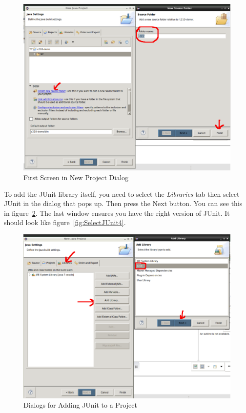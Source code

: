 \documentclass[nobib]{tufte-handout}
\begin{document}
\vspace{.1in}
\begin{center}
\begin{figure}[!htb]
\includegraphics[scale=.3]{Eclipse-AddTestFolder.png}
\caption{First Screen in New Project Dialog}
\label{fig:newsrcfold}
\end{figure}
\end{center}
\vspace{.1in}

To add the JUnit library itself, you need to select the \textit{Libraries} tab then select JUnit in the dialog that pops up. Then press the Next button. You can see this in figure~\ref{fig:AddJUnitLib}. The last window ensures you have the right version of JUnit. It should look like figure~\ref{fig:SelectJUnit4}.

\vspace{.1in}
\begin{center}
\begin{figure}[!htb]
\includegraphics[scale=.3]{Eclipse-AddJUnitLib.png}
\caption{Dialogs for Adding JUnit to a Project}
\label{fig:AddJUnitLib}
\end{figure}
\end{center}
\vspace{.1in}
\end{document}

